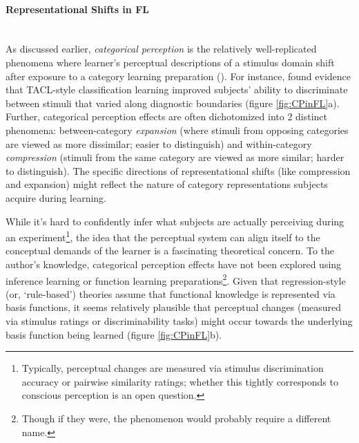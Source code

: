 \documentclass[12pt]{article}
\let\oldcite=\cite
\let\oldtextcite=\textcite
\renewcommand{\cite}[1]{\textcolor[rgb]{0, .121, .388}{\oldcite{#1}}}
\renewcommand{\textcite}[1]{\textcolor[rgb]{0, .121, .388}{\oldtextcite{#1}}}
\begin{document}
\paragraph{Representational Shifts in FL}\mbox{}\\

As discussed earlier, \emph{categorical perception} is the relatively well-replicated phenomena where learner's perceptual descriptions of a stimulus domain shift after exposure to a category learning preparation (\cite{goldstone1994role,liberman1957discrimination,harnad1987psychophysical,livingston1998categorical}). For instance, \textcite{goldstone1994role} found evidence that TACL-style classification learning improved subjects' ability to discriminate between stimuli that varied along diagnostic boundaries (figure \ref{fig:CPinFL}a). Further, categorical perception effects are often dichotomized into 2 distinct phenomena: between-category \emph{expansion} (where stimuli from opposing categories are viewed as more dissimilar; easier to distinguish) and within-category \emph{compression} (stimuli from the same category are viewed as more similar; harder to distinguish). The specific directions of representational shifts (like compression and expansion) might reflect the nature of category representations subjects acquire during learning.

While it's hard to confidently infer what subjects are actually perceiving during an experiment\footnote{Typically, perceptual changes are measured via stimulus discrimination accuracy or pairwise similarity ratings; whether this tightly corresponds to conscious perception is an open question.}, the idea that the perceptual system can align itself to the conceptual demands of the learner is a fascinating theoretical concern. To the author's knowledge, categorical perception effects have not been explored using inference learning or function learning preparations\footnote{Though if they were, the phenomenon would probably require a different name.}. Given that regression-style (or, `rule-based') theories assume that functional knowledge is represented via basis functions, it seems relatively plausible that perceptual changes (measured via stimulus ratings or discriminability tasks) might occur towards the underlying basis function being learned (figure \ref{fig:CPinFL}b). 
\end{document}
